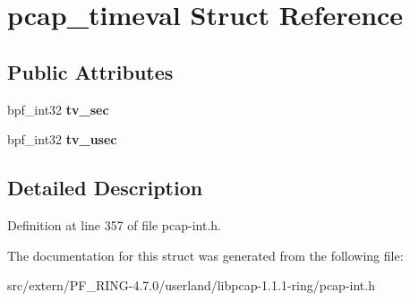 \hypertarget{structpcap__timeval}{
\section{pcap\_\-timeval Struct Reference}
\label{structpcap__timeval}
}
\subsection*{Public Attributes}
\begin{DoxyCompactItemize}
\item 
\hypertarget{structpcap__timeval_a55e71104745c728ed27f565371f615d2}{
bpf\_\-int32 {\bfseries tv\_\-sec}}
\label{structpcap__timeval_a55e71104745c728ed27f565371f615d2}

\item 
\hypertarget{structpcap__timeval_ab2270e008f3ade9c45568785284fb19e}{
bpf\_\-int32 {\bfseries tv\_\-usec}}
\label{structpcap__timeval_ab2270e008f3ade9c45568785284fb19e}

\end{DoxyCompactItemize}


\subsection{Detailed Description}


Definition at line 357 of file pcap-\/int.h.



The documentation for this struct was generated from the following file:\begin{DoxyCompactItemize}
\item 
src/extern/PF\_\-RING-\/4.7.0/userland/libpcap-\/1.1.1-\/ring/pcap-\/int.h\end{DoxyCompactItemize}
